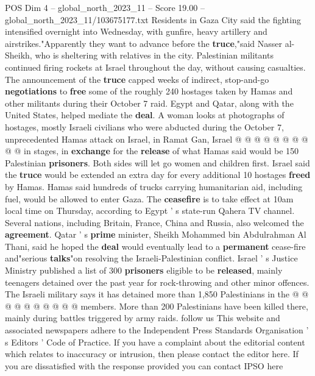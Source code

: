 \begin{textsample}{POS Dim 4 – global\_north\_2023\_11 – Score 19.00 – global\_north\_2023\_11/103675177.txt}
Residents in Gaza City said the fighting intensified overnight into Wednesday, with gunfire, heavy artillery and airstrikes."Apparently they want to advance before the \textbf{truce},"said Nasser al-Sheikh, who is sheltering with relatives in the city.
Palestinian militants continued firing rockets at Israel throughout the day, without causing casualties.
The announcement of the \textbf{truce} capped weeks of indirect, stop-and-go \textbf{negotiations} to \textbf{free} some of the roughly 240 hostages taken by Hamas and other militants during their October 7 raid.
Egypt and Qatar, along with the United States, helped mediate the \textbf{deal}.
A woman looks at photographs of hostages, mostly Israeli civilians who were abducted during the October 7, unprecedented Hamas attack on Israel, in Ramat Gan, Israel @ @ @ @ @ @ @ @ @ @ in stages, in \textbf{exchange} for the \textbf{release} of what Hamas said would be 150 Palestinian \textbf{prisoners}.
Both sides will let go women and children first.
Israel said the \textbf{truce} would be extended an extra day for every additional 10 hostages \textbf{freed} by Hamas.
Hamas said hundreds of trucks carrying humanitarian aid, including fuel, would be allowed to enter Gaza.
The \textbf{ceasefire} is to take effect at 10am local time on Thursday, according to Egypt ' s state-run Qahera TV channel.
Several nations, including Britain, France, China and Russia, also welcomed the \textbf{agreement}.
Qatar ' s \textbf{prime} minister, Sheikh Mohammed bin Abdulrahman Al Thani, said he hoped the \textbf{deal} would eventually lead to a \textbf{permanent} cease-fire and"serious \textbf{talks}"on resolving the Israeli-Palestinian conflict.
Israel ' s Justice Ministry published a list of 300 \textbf{prisoners} eligible to be \textbf{released}, mainly teenagers detained over the past year for rock-throwing and other minor offences.
The Israeli military says it has detained more than 1,850 Palestinians in the @ @ @ @ @ @ @ @ @ @ members.
More than 200 Palestinians have been killed there, mainly during battles triggered by army raids. follow us This website and associated newspapers adhere to the Independent Press Standards Organisation ' s Editors ' Code of Practice.
If you have a complaint about the editorial content which relates to inaccuracy or intrusion, then please contact the editor here.
If you are dissatisfied with the response provided you can contact IPSO here

\end{textsample}
